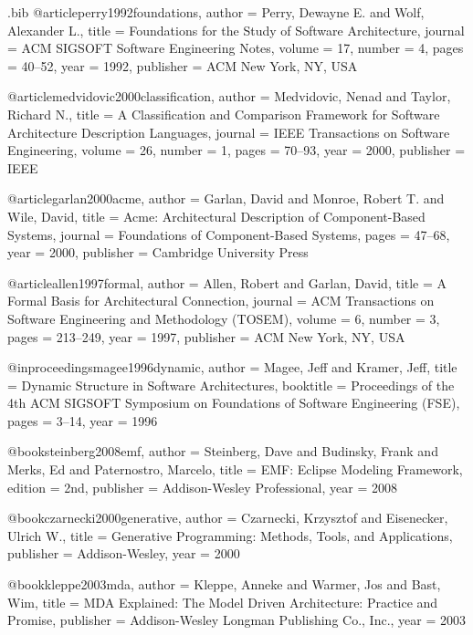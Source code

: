 \begin{filecontents*}{\jobname.bib}
@article{perry1992foundations,
  author    = {Perry, Dewayne E. and Wolf, Alexander L.},
  title     = {Foundations for the Study of Software Architecture},
  journal   = {ACM SIGSOFT Software Engineering Notes},
  volume    = {17},
  number    = {4},
  pages     = {40--52},
  year      = {1992},
  publisher = {ACM New York, NY, USA}
}

@article{medvidovic2000classification,
  author    = {Medvidovic, Nenad and Taylor, Richard N.},
  title     = {A Classification and Comparison Framework for Software Architecture Description Languages},
  journal   = {IEEE Transactions on Software Engineering},
  volume    = {26},
  number    = {1},
  pages     = {70--93},
  year      = {2000},
  publisher = {IEEE}
}

@article{garlan2000acme,
  author    = {Garlan, David and Monroe, Robert T. and Wile, David},
  title     = {Acme: Architectural Description of Component-Based Systems},
  journal   = {Foundations of Component-Based Systems},
  pages     = {47--68},
  year      = {2000},
  publisher = {Cambridge University Press}
}

@article{allen1997formal,
  author    = {Allen, Robert and Garlan, David},
  title     = {A Formal Basis for Architectural Connection},
  journal   = {ACM Transactions on Software Engineering and Methodology (TOSEM)},
  volume    = {6},
  number    = {3},
  pages     = {213--249},
  year      = {1997},
  publisher = {ACM New York, NY, USA}
}

@inproceedings{magee1996dynamic,
  author    = {Magee, Jeff and Kramer, Jeff},
  title     = {Dynamic Structure in Software Architectures},
  booktitle = {Proceedings of the 4th ACM SIGSOFT Symposium on Foundations of Software Engineering (FSE)},
  pages     = {3--14},
  year      = {1996}
}

@book{steinberg2008emf,
  author    = {Steinberg, Dave and Budinsky, Frank and Merks, Ed and Paternostro, Marcelo},
  title     = {EMF: Eclipse Modeling Framework},
  edition   = {2nd},
  publisher = {Addison-Wesley Professional},
  year      = {2008}
}

@book{czarnecki2000generative,
  author    = {Czarnecki, Krzysztof and Eisenecker, Ulrich W.},
  title     = {Generative Programming: Methods, Tools, and Applications},
  publisher = {Addison-Wesley},
  year      = {2000}
}

@book{kleppe2003mda,
  author    = {Kleppe, Anneke and Warmer, Jos and Bast, Wim},
  title     = {MDA Explained: The Model Driven Architecture: Practice and Promise},
  publisher = {Addison-Wesley Longman Publishing Co., Inc.},
  year      = {2003}
}


\end{filecontents*}
